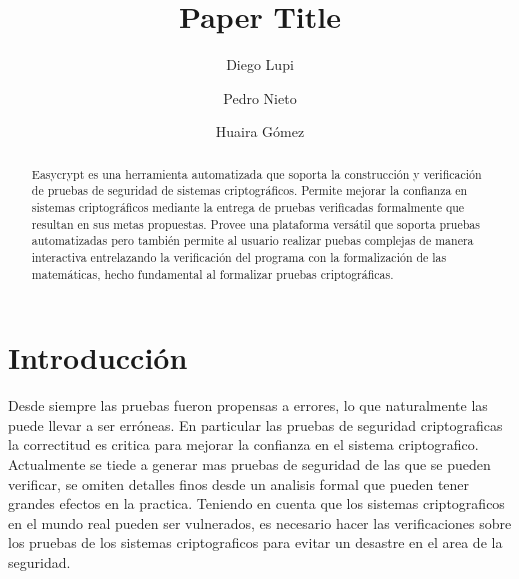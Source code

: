 \documentclass[runningheads]{llncs}
\begin{document}
\title{Paper Title}

\author{Diego Lupi\and Pedro Nieto\and Huaira Gómez}

%
%

\maketitle

\begin{abstract}
Easycrypt\cite{ref_article1} es una herramienta automatizada que soporta la construcción y verificación de pruebas de seguridad de sistemas criptográficos. Permite mejorar la confianza en sistemas criptográficos mediante la entrega de pruebas verificadas formalmente que resultan en sus metas propuestas. Provee una plataforma versátil que soporta pruebas automatizadas pero también permite al usuario realizar puebas complejas de manera interactiva entrelazando la verificación del programa con la formalización de las matemáticas, hecho fundamental al formalizar pruebas criptográficas.

\end{abstract}
%
%
%
\section{Introducción}
Desde siempre las pruebas fueron propensas a errores, lo que naturalmente las puede llevar a ser erróneas. En particular las pruebas de seguridad criptograficas la correctitud es critica para mejorar la confianza en el sistema criptografico. Actualmente se tiede a generar mas pruebas de seguridad de las que se pueden verificar, se omiten detalles finos desde un analisis formal que pueden tener grandes efectos en la practica. Teniendo en cuenta que los sistemas criptograficos en el mundo real pueden ser vulnerados, es necesario hacer las verificaciones sobre los pruebas de los sistemas criptograficos para evitar un desastre en el area de la seguridad.
\end{document}
